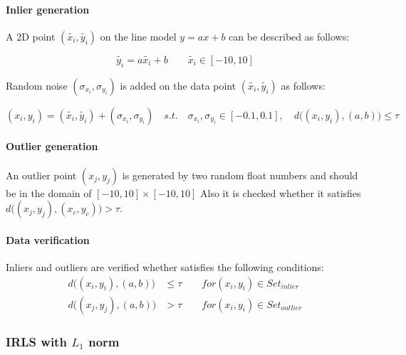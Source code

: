 \documentclass[paper=a4, fontsize=11pt]{scrartcl} %
\numberwithin{equation}{section} %
\numberwithin{figure}{section} %
\numberwithin{table}{section} %
\begin{document}
\paragraph{Inlier generation}

A 2D point $(\tilde{x_{i}}, \tilde{y_{i}})$ on the line model $y = ax + b$ can be described as follows:

\begin{equation*}
\tilde{y_{i}} = a\tilde{x_{i}} + b \qquad \tilde{x_{i}} \in [-10, 10]
\end{equation*}

Random noise $(\sigma_{x_{i}}, \sigma_{y_{i}})$ is added on the data point $(\tilde{x_{i}}, \tilde{y_{i}})$ as follows:

\begin{equation*}
(x_{i}, y_{i}) = (\tilde{x_{i}}, \tilde{y_{i}}) + (\sigma_{x_{i}}, \sigma_{y_{i}}) \quad
s.t. \quad \sigma_{x_{i}}, \sigma_{y_{i}} \in [-0.1, 0.1], \quad d \big( (x_{i}, y_{i}), (a, b) \big) \leq \tau 
\end{equation*}


\paragraph{Outlier generation}

An outlier point $(x_{j}, y_{j})$ is generated by two random float numbers and should be in the domain of $[-10, 10] \times [-10, 10]$ Also it is checked whether it satisfies $d \big( (x_{j}, y_{j}), (x_{c}, y_{c}) \big) > \tau$. 

\paragraph{Data verification}

Inliers and outliers are verified whether satisfies the following conditions:
\begin{align*}
d \big( (x_{i}, y_{i}), (a, b) \big) &\leq \tau  \qquad for (x_{i}, y_{i}) \in Set_{inlier} \\
d \big( (x_{j}, y_{j}), (a, b) \big) &> \tau \qquad for (x_{i}, y_{i}) \in Set_{outlier} 
\end{align*}

\subsubsection{IRLS with $L_{1}$ norm}
\end{document}
